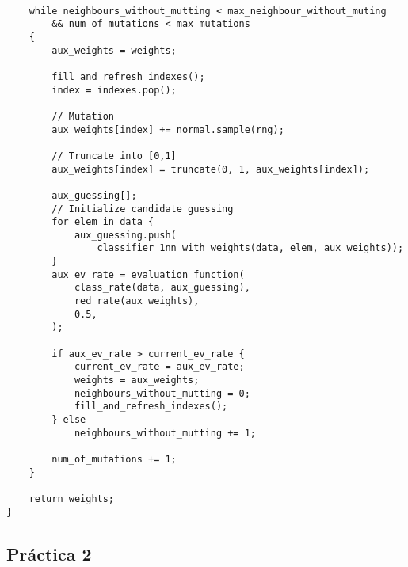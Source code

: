 \documentclass[size=a4, parskip=half, titlepage=false, toc=flat, toc=bib, 12pt]{scrartcl}
\begin{document}
\begin{verbatim}

    while neighbours_without_mutting < max_neighbour_without_muting
        && num_of_mutations < max_mutations
    {
        aux_weights = weights;

        fill_and_refresh_indexes();
        index = indexes.pop();

        // Mutation
        aux_weights[index] += normal.sample(rng);

        // Truncate into [0,1]
        aux_weights[index] = truncate(0, 1, aux_weights[index]);

        aux_guessing[];
        // Initialize candidate guessing
        for elem in data {
            aux_guessing.push(
                classifier_1nn_with_weights(data, elem, aux_weights));
        }
        aux_ev_rate = evaluation_function(
            class_rate(data, aux_guessing),
            red_rate(aux_weights),
            0.5,
        );

        if aux_ev_rate > current_ev_rate {
            current_ev_rate = aux_ev_rate;
            weights = aux_weights;
            neighbours_without_mutting = 0;
            fill_and_refresh_indexes();
        } else
            neighbours_without_mutting += 1;

        num_of_mutations += 1;
    }

    return weights;
}

\end{verbatim}

\subsection{Práctica 2}
\end{document}
